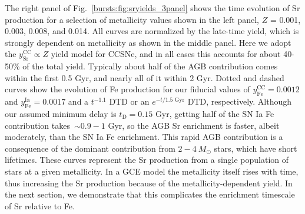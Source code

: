 
The right panel of Fig.~\ref{bursts:fig:sryields_3panel} shows the time evolution of 
Sr production for a selection of metallicity values shown in the left panel, 
$Z$ = 0.001, 0.003, 0.008, and 0.014. All curves are normalized by the 
late-time yield, which is strongly dependent on metallicity as shown in the 
middle panel. Here we adopt the $y_\text{Sr}^\text{CC} \propto Z$ yield model 
for CCSNe, and in all cases this accounts for about 40-50\% of the total yield. 
Typically about half of the AGB contribution comes within the first 0.5 Gyr, 
and nearly all of it within 2 Gyr. Dotted and dashed curves show the evolution 
of Fe production for our fiducial values of $y_\text{Fe}^\text{CC} = 0.0012$ 
and $y_\text{Fe}^\text{Ia} = 0.0017$ and a $t^{-1.1}$ DTD or an 
$e^{-t/1.5\text{ Gyr}}$ DTD, respectively. Although our assumed minimum delay 
is $t_\text{D} = 0.15$ Gyr, getting half of the SN Ia Fe contribution 
takes~$\sim0.9 - 1$ Gyr, so the AGB Sr enrichment is faster, albeit moderately, 
than the SN Ia Fe enrichment. This rapid AGB contribution is a consequence of 
the dominant contribution from $2 - 4\ M_\odot$ stars, which have short 
lifetimes. These curves represent the Sr production from a single population of 
stars at a given metallicity. In a GCE model the metallicity itself rises with 
time, thus increasing the Sr production because of the metallicity-dependent 
yield. In the next section, we demonstrate that this complicates the 
enrichment timescale of Sr relative to Fe. 

